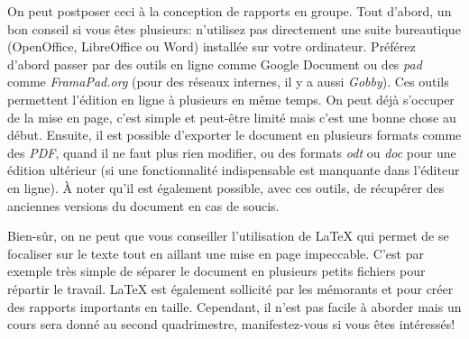 On peut postposer ceci à la conception de rapports en groupe. Tout d'abord, un bon conseil si vous êtes plusieurs: n'utilisez pas directement une suite bureautique (OpenOffice, LibreOffice ou Word) installée sur votre ordinateur. Préférez d'abord passer par des outils en ligne comme Google Document ou des \textit{pad} comme \textit{FramaPad.org} (pour des réseaux internes, il y a aussi \textit{Gobby}). Ces outils permettent l'édition en ligne à plusieurs en même temps. On peut déjà s'occuper de la mise en page, c'est simple et peut-être limité mais c'est une bonne chose au début. Ensuite, il est possible d'exporter le document en plusieurs formats comme des \textit{PDF}, quand il ne faut plus rien modifier, ou des formats \textit{odt} ou \textit{doc} pour une édition ultérieur (si une fonctionnalité indispensable est manquante dans l'éditeur en ligne). À noter qu'il est également possible, avec ces outils, de récupérer des anciennes versions du document en cas de soucis.

Bien-sûr, on ne peut que vous conseiller l'utilisation de \LaTeX{} qui permet de se focaliser sur le texte tout en aillant une mise en page impeccable. C'est par exemple très simple de séparer le document en plusieurs petits fichiers pour répartir le travail. \LaTeX{} est également sollicité par les mémorants et pour créer des rapports importants en taille. Cependant, il n'est pas facile à aborder mais un cours sera donné au second quadrimestre, manifestez-vous si vous êtes intéressés!
                                                                                                                   

	
	